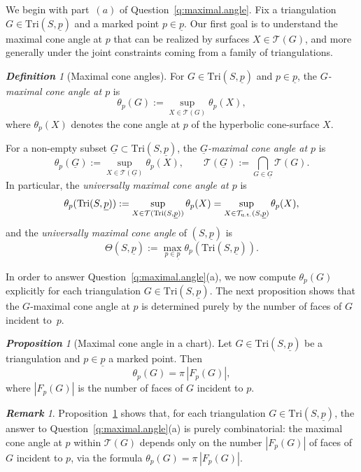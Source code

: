 \documentclass[11pt, letterpaper]{amsart}
\theoremstyle{definition}
\theoremstyle{remark}
\newtheorem{proposition}[theorem]{\rm\bf Proposition}
\newtheorem{definition}[theorem]{\rm\bf Definition}
\newtheorem{remark}[theorem]{\rm\bf Remark}
\newcommand{\up}{\underline{p}}
\newcommand{\Sp}{(S,\up)}
\newcommand{\TSp}{\text{Tri}\Sp}
\newcommand{\cT}{\mathcal{T}}
\newcommand{\DEF}{} \newcommand{\WARN}{\textcolor{red}} \newcommand{\ALT}{\textcolor{brown}} \newcommand{\TODO}{\textcolor{teal}} %
\numberwithin{equation}{section}
\begin{document}
We begin with part~\((a)\) of Question~\ref{q:maximal.angle}.
Fix a triangulation \(G\in\TSp\) and a marked point \(p\in\up\).
Our first goal is to understand the maximal cone angle at \(p\) that can be
realized by surfaces \(X\in\cT(G)\), and more generally under the joint
constraints coming from a family of triangulations.

\begin{definition}[Maximal cone angles] 
\label{def:max.cone.angles}
For \(G\in\TSp\) and \(p\in\up\), the \DEF{\em \(G\)-maximal cone angle at \(p\)}
is
\[
\theta_p(G):=\sup_{X\in\cT(G)}\theta_p(X),
\]
where \(\theta_p(X)\) denotes the cone angle at \(p\) of the hyperbolic
cone-surface \(X\).

For a non-empty subset \(\underline{G}\subset\TSp\), the
\DEF{\em \(\underline{G}\)-maximal cone angle at \(p\)} is
\[
\theta_p(\underline{G})
:=\sup_{X\in\cT(\underline{G})}\theta_p(X),
\qquad
\cT(\underline{G}):=\bigcap_{G\in\underline{G}}\cT(G).
\]
In particular, the \DEF{\em universally maximal cone angle at \(p\)} is
\[
\theta_p(\TSp)
:=\sup_{X\in\cT(\TSp)}\theta_p(X)
=\sup_{X\in\cT_{\rm u.t.}\Sp}\theta_p(X),
\]
and the \DEF{\em universally maximal cone angle} of \(\Sp\) is
\[
\Theta\Sp:=\max_{p\in\up}\theta_p(\TSp).
\]
\end{definition}

In order to answer Question~\ref{q:maximal.angle}(a), we now compute
\(\theta_p(G)\) explicitly for each triangulation \(G\in\TSp\).
The next proposition shows that the \(G\)-maximal cone angle at \(p\) is
determined purely by the number of faces of \(G\) incident to~\(p\).

\begin{proposition}[Maximal cone angle in a chart]
\label{prop:angle.face}
Let \(G\in\TSp\) be a triangulation and \(p\in\up\) a marked point.
Then
\[
\theta_p(G)=\pi\,|F_p(G)|,
\]
where \(|F_p(G)|\) is the number of faces of \(G\) incident to \(p\).
\end{proposition}

\begin{remark}
Proposition~\ref{prop:angle.face} shows that, for each triangulation
\(G\in\TSp\), the answer to Question~\ref{q:maximal.angle}(a) is purely
combinatorial: the maximal cone angle at \(p\) within \(\cT(G)\) depends only
on the number \(|F_p(G)|\) of faces of \(G\) incident to \(p\), via the
formula \(\theta_p(G)=\pi\,|F_p(G)|\).
\end{remark}
\end{document}
